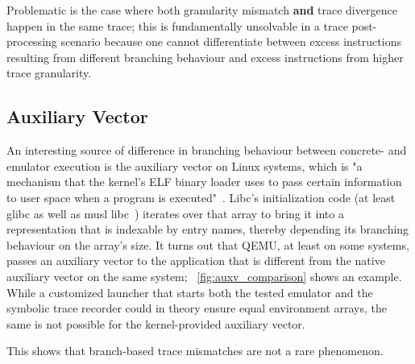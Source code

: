 Problematic is the case where both granularity mismatch \textbf{and} trace divergence happen in the same trace; this is
fundamentally unsolvable in a trace post-processing scenario because one cannot differentiate between excess
instructions resulting from different branching behaviour and excess instructions from higher trace granularity.

\subsection{Auxiliary Vector}\label{sec:auxv}

An interesting source of difference in branching behaviour between concrete- and emulator execution is the auxiliary
vector on Linux systems, which is "a mechanism that the kernel's ELF binary loader uses to pass certain information to
user space when a program is executed"~\cite{getauxval2024Mar}. Libc's initialization code (at least glibc as well as
musl libc~\cite{MuslLibc2024Feb}) iterates over that array to bring it into a representation that is indexable by entry
names, thereby depending its branching behaviour on the array's size. It turns out that QEMU, at least on some systems,
passes an auxiliary vector to the application that is different from the native auxiliary vector on the same system;
\figurename~\ref{fig:auxv_comparison} shows an example. While a customized launcher that starts both the tested emulator
and the symbolic trace recorder could in theory ensure equal environment arrays, the same is not possible for the
kernel-provided auxiliary vector.

This shows that branch-based trace mismatches are not a rare phenomenon.

